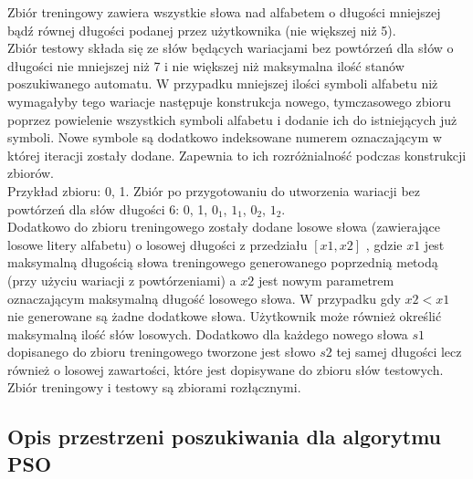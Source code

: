 \documentclass[runningheads,a4paper]{llncs}
\begin{document}
Zbiór treningowy zawiera wszystkie słowa nad alfabetem o długości mniejszej bądź równej długości podanej przez użytkownika (nie większej niż 5). \\

Zbiór testowy składa się ze słów będących wariacjami bez powtórzeń dla słów o  długości nie mniejszej niż 7 i nie większej niż maksymalna ilość stanów poszukiwanego automatu. W przypadku mniejszej ilości symboli alfabetu niż wymagałyby tego wariacje następuje konstrukcja nowego, tymczasowego zbioru poprzez powielenie wszystkich symboli alfabetu i dodanie ich do istniejących już symboli. Nowe symbole są dodatkowo indeksowane numerem oznaczającym w której iteracji zostały dodane. Zapewnia to ich rozróżnialność podczas konstrukcji zbiorów.\\

Przykład zbioru: {0, 1}. 
Zbiór po przygotowaniu do utworzenia wariacji bez powtórzeń dla słów długości 6: {0, 1, $0_{1}$, $1_{1}$, $0_{2}$, $1_{2}$}. \\

Dodatkowo do zbioru treningowego zostały dodane losowe słowa (zawierające losowe litery alfabetu) o losowej długości z przedziału $[x1,x2]$ , gdzie $x1$ jest maksymalną długością słowa treningowego generowanego poprzednią metodą (przy użyciu wariacji z powtórzeniami) a $x2$ jest nowym parametrem oznaczającym maksymalną długość losowego słowa. W przypadku gdy $x2 < x1$ nie generowane są żadne dodatkowe słowa. Użytkownik może również określić maksymalną ilość słów losowych. Dodatkowo dla każdego nowego słowa $s1$ dopisanego do zbioru treningowego tworzone jest słowo $s2$ tej samej długości lecz również o losowej zawartości, które jest dopisywane do zbioru słów testowych. \\

Zbiór treningowy i testowy są zbiorami rozłącznymi.\\

\subsection{Opis przestrzeni poszukiwania dla algorytmu PSO}
\end{document}
